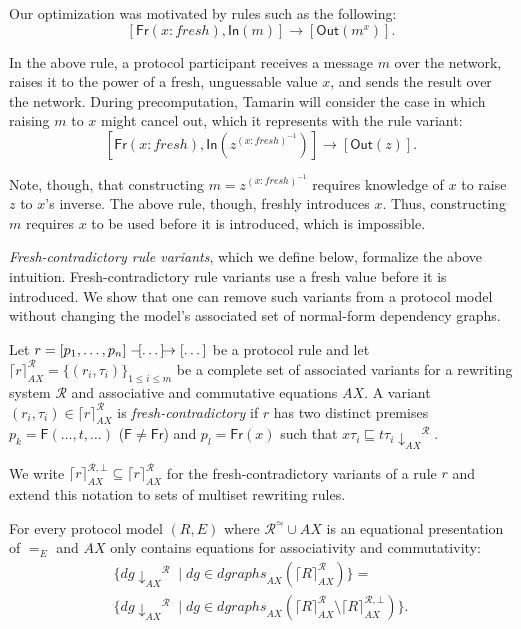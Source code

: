 \documentclass[envcountsame,orivec]{llncs}
\newcommand{\fresh}{\ensuremath{\mathit{fresh}}}
\newcommand{\ofsort}[2]{\ensuremath{#1{:}#2}}
\newcommand{\fact}[1]{\ensuremath{\mathsf{#1}}}
\newcommand{\lrule}[1]{\ensuremath{\mathrel{-\mkern-4mu[#1]\mkern-8mu\to}}}
\newcommand{\dgraphs}{\ensuremath{\mathit{dgraphs}}}
\newcommand{\R}{\ensuremath{\mathcal{R}}}
\newcommand{\Fr}{\fact{Fr}}
\newcommand{\In}{\fact{In}}
\newcommand{\Out}{\fact{Out}}
\newcommand{\normf}{\ensuremath{{\downarrow}_{AX}}}
\newcommand{\variants}[1]{\ensuremath{\lceil #1 \rceil}_{AX}}
\begin{document}
Our optimization was motivated by rules such as the following:
$$[  \Fr(\ofsort{x}{\fresh}), \In(m) ] \rightarrow [ \Out(m^x) ].$$

In the above rule, a protocol participant receives a message $m$ over the network, raises it to the power of a fresh, unguessable value $x$, and sends the result over the network.
During precomputation, Tamarin will consider the case in which raising $m$ to $x$ might cancel out, which it represents with the rule variant:
$$[ \Fr(\ofsort{x}{\fresh}), \In(z^{(\ofsort{x}{\fresh})^{-1}}) ] \rightarrow [ \Out(z) ].$$

Note, though, that constructing $m = z^{(\ofsort{x}{\fresh})^{-1}}$ requires knowledge of $x$ to raise $z$ to $x$'s inverse.
The above rule, though, freshly introduces $x$.
Thus, constructing $m$ requires $x$ to be used before it is introduced, which is impossible.

\emph{Fresh-contradictory rule variants}, which we define below, formalize the above intuition.
Fresh-contradictory rule variants use a fresh value before it is introduced.
We show that one can remove such variants from a protocol model without changing the model's associated set of normal-form dependency graphs.

\begin{definition} \label{def:fresh-contradictory}
  Let $r = [ p_1, \dots, p_n] \lrule{\dots} [\dots]$ be a protocol rule and let $\variants{r}^\R = \{(r_i, \tau_i)\}_{1 \leq i \leq m}$ be a complete set of associated variants for a rewriting system $\R$ and associative and commutative equations $AX$.
  A variant $(r_i, \tau_i) \in \variants{r}^\R$ is \emph{fresh-contradictory} if $r$ has two distinct premises $p_k = \fact{F}(\dots, t, \dots)$ ($\fact{F} \neq \Fr$) and $p_l = \Fr(x)$ such that $x\tau_i \sqsubseteq t\tau_i \normf^\R$.
\end{definition}

We write $\variants{r}^{\R,\bot} \subseteq \variants{r}^\R$ for the fresh-contradictory variants of a rule $r$ and extend this notation to sets of multiset rewriting rules.

\begin{lemma} \label{lem:ndg-eq}
  For every protocol model $(R, E)$ where $\R^\simeq \cup AX$ is an equational presentation of $=_E$ and $AX$ only contains equations for associativity and commutativity:
  \begin{multline*}
    \{ dg\normf^\R \mid dg \in \dgraphs_{AX}(\variants{R}^\R) \} = \\ \{ dg\normf^\R \mid dg \in \dgraphs_{AX}(\variants{R}^\R \setminus \variants{R}^{\R,\bot})\}.
  \end{multline*}
\end{lemma}
\end{document}
